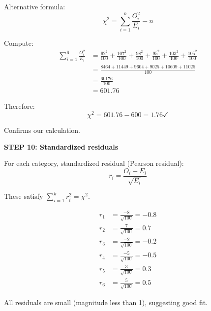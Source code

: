 \documentclass[12pt]{article}
\begin{document}
\begin{solution}
Alternative formula:
\[
\chi^2 = \sum_{i=1}^k \frac{O_i^2}{E_i} - n
\]

Compute:
\begin{align*}
\sum_{i=1}^6 \frac{O_i^2}{E_i} &= \frac{92^2}{100} + \frac{107^2}{100} + \frac{98^2}{100} + \frac{95^2}{100} + \frac{103^2}{100} + \frac{105^2}{100} \\
&= \frac{8464 + 11449 + 9604 + 9025 + 10609 + 11025}{100} \\
&= \frac{60176}{100} \\
&= 601.76
\end{align*}

Therefore:
\[
\chi^2 = 601.76 - 600 = 1.76 \checkmark
\]

Confirms our calculation.

\textbf{STEP 10: Standardized residuals}

For each category, standardized residual (Pearson residual):
\[
r_i = \frac{O_i - E_i}{\sqrt{E_i}}
\]

These satisfy $\sum_{i=1}^k r_i^2 = \chi^2$.

\begin{align*}
r_1 &= \frac{-8}{\sqrt{100}} = -0.8 \\
r_2 &= \frac{7}{\sqrt{100}} = 0.7 \\
r_3 &= \frac{-2}{\sqrt{100}} = -0.2 \\
r_4 &= \frac{-5}{\sqrt{100}} = -0.5 \\
r_5 &= \frac{3}{\sqrt{100}} = 0.3 \\
r_6 &= \frac{5}{\sqrt{100}} = 0.5
\end{align*}

All residuals are small (magnitude less than 1), suggesting good fit.

\end{solution}
\end{document}
